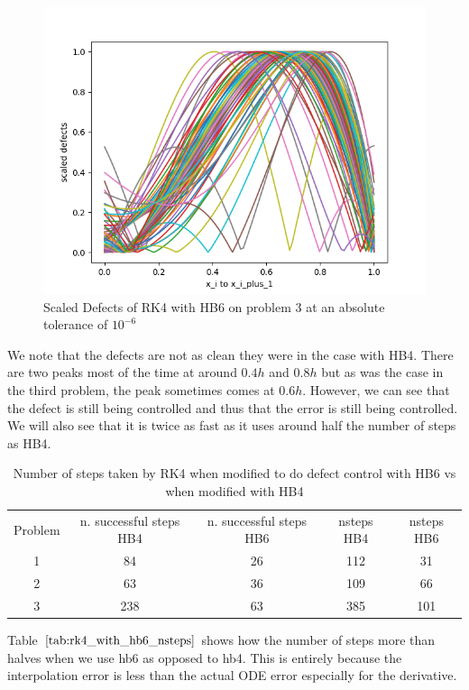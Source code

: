 \documentclass{article}
\begin{document}
\begin{figure}[H]
\centering
\includegraphics[width=0.7\linewidth]{./figures/rk4_with_hb6_p3_scaled_defects}
\caption{Scaled Defects of RK4 with HB6 on problem 3 at an absolute tolerance of $10^{-6}$}
\label{fig:rk4_with_hb6_p3_scaled_defects}
\end{figure}

We note that the defects are not as clean they were in the case with HB4. There are two peaks most of the time at around $0.4h$ and $0.8h$ but as was the case in the third problem, the peak sometimes comes at $0.6h$. However, we can see that the defect is still being controlled and thus that the error is still being controlled. We will also see that it is twice as fast as it uses around half the number of steps as HB4.

\begin{table}[h]
\caption {Number of steps taken by RK4 when modified to do defect control with HB6 vs when modified with HB4} \label{tab:rk4_with_hb6_nsteps}
\begin{center}
\begin{tabular}{ c c c c c } 
Problem & n. successful steps HB4 & n. successful steps HB6 & nsteps HB4  & nsteps HB6 \\ 
1       & 84                      &        26               & 112         & 31\\ 
2       & 63                      &        36               & 109         & 66\\
3       & 238                     &        63               & 385         & 101\\
\end{tabular}
\end{center}
\end{table}

Table $\ref{tab:rk4_with_hb6_nsteps}$ shows how the number of steps more than halves when we use hb6 as opposed to hb4. This is entirely because the interpolation error is less than the actual ODE error especially for the derivative.
\end{document}

